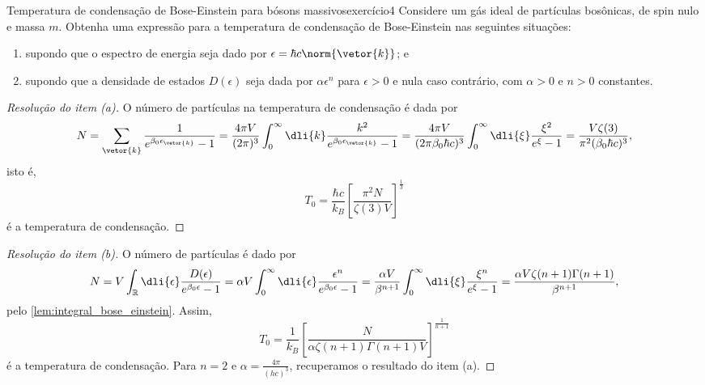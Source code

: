 \begin{exercício}{Temperatura de condensação de Bose-Einstein para bósons massivos}{exercício4}
    Considere um gás ideal de partículas bosônicas, de spin nulo e massa \(m\). Obtenha uma expressão para a temperatura de condensação de Bose-Einstein nas seguintes situações:
    \begin{enumerate}[label=(\alph*)]
        \item supondo que o espectro de energia seja dado por \(\epsilon = \hbar c \norm{\vetor{k}}\); e
        \item supondo que a densidade de estados \(D(\epsilon)\) seja dada por \(\alpha \epsilon^n\) para \(\epsilon > 0\) e nula caso contrário, com \(\alpha > 0\) e \(n > 0\) constantes.
    \end{enumerate}
\end{exercício}
\begin{proof}[Resolução do item (a)]
    O número de partículas na temperatura de condensação é dada por
    \begin{equation*}
        N = \sum_{\vetor{k}} \frac{1}{e^{\beta_0 \epsilon_{\vetor{k}}} - 1} = \frac{4\pi V}{(2\pi)^3} \int_0^\infty \dli{k} \frac{k^2}{e^{\beta_0 \epsilon_{\vetor{k}}} - 1} = \frac{4\pi V}{(2\pi \beta_0 \hbar c)^3} \int_0^\infty \dli{\xi} \frac{\xi^2}{e^{\xi} - 1} = \frac{V \zeta(3)}{\pi^2(\beta_0 \hbar c)^3},
    \end{equation*}
    isto é,
    \begin{equation*}
        T_0 = \frac{\hbar c}{k_B}\left[\frac{\pi^2 N}{\zeta(3)V}\right]^{\frac13}
    \end{equation*}
    é a temperatura de condensação.
\end{proof}
\begin{proof}[Resolução do item (b)]
    O número de partículas é dado por
    \begin{equation*}
        N = V\int_{\mathbb{R}} \dli{\epsilon} \frac{D(\epsilon)}{e^{\beta_0 \epsilon} - 1} = \alpha V \int_{0}^{\infty} \dli{\epsilon}\frac{\epsilon^n}{e^{\beta_0 \epsilon} - 1} = \frac{\alpha V}{\beta^{n+1}} \int_0^\infty \dli{\xi}\frac{\xi^n}{e^{\xi} - 1} = \frac{\alpha V \zeta(n + 1)\Gamma(n+1)}{\beta^{n+1}},
    \end{equation*}
    pelo \cref{lem:integral_bose_einstein}. Assim,
    \begin{equation*}
        T_0 = \frac{1}{k_B}\left[\frac{N}{\alpha \zeta(n+1) \Gamma(n+1) V}\right]^{\frac1{n+1}}
    \end{equation*}
    é a temperatura de condensação. Para \(n = 2\) e \(\alpha = \frac{4\pi}{(h c)^3}\), recuperamos o resultado do item (a).
\end{proof}
